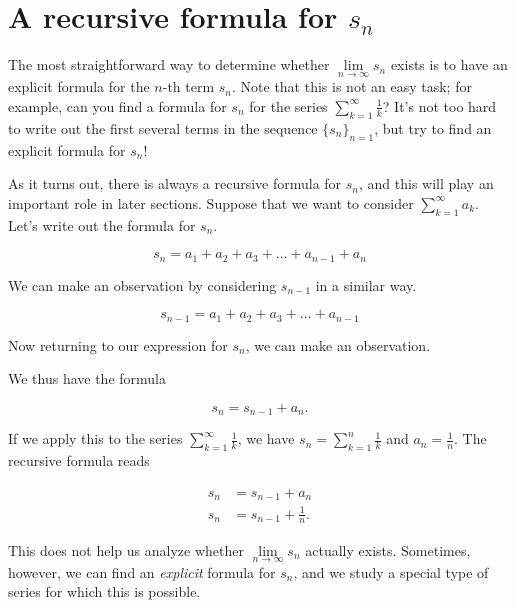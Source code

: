 \documentclass{ximera}
\begin{document}
\section{A recursive formula for $s_n$}
The most straightforward way to determine whether $\lim\limits_{n \to \infty} s_n$ exists is to have an explicit formula for the $n$-th term $s_n$.  Note that this is not an easy task; for example, can you find a formula for $s_n$ for the series $\sum\limits_{k=1}^{\infty} \frac{1}{k}$? It's not too hard to write out the first several terms in the sequence $\{s_n\}_{n=1}$, but try to find an explicit formula for $s_n$!

As it turns out, there is always a recursive formula for $s_n$, and this will play an important role in later sections.  Suppose that we want to consider $\sum\limits_{k=1}^{\infty} a_k$.  Let's write out the formula for $s_n$.

\[
s_n = a_1+a_2+a_3+\ldots+a_{n-1}+a_n
\]

We can make an observation by considering $s_{n-1}$ in a similar way.

\[
s_{n-1} = a_1+a_2+a_3+\ldots+a_{n-1}
\]

Now returning to our expression for $s_n$, we can make an observation. 
\begin{image}
  \end{image}

We thus have the formula 

\[
s_n = s_{n-1}+a_n.
\]

If we apply this to the series $\sum\limits_{k=1}^{\infty} \frac{1}{k}$, we have $s_n = \sum\limits_{k=1}^n \frac{1}{k}$ and $a_n = \frac{1}{n}$.  The recursive formula reads 

\begin{align*}
s_n &= s_{n-1} +a_n\\
s_n &= s_{n-1} +  \frac{1}{n}.
\end{align*}

This does not help us analyze whether $\lim\limits_{n \to \infty} s_n$ actually exists.  Sometimes, however, we can find an \emph{explicit} formula for $s_n$, and we study a special type of series for which this is possible.
\end{document}
